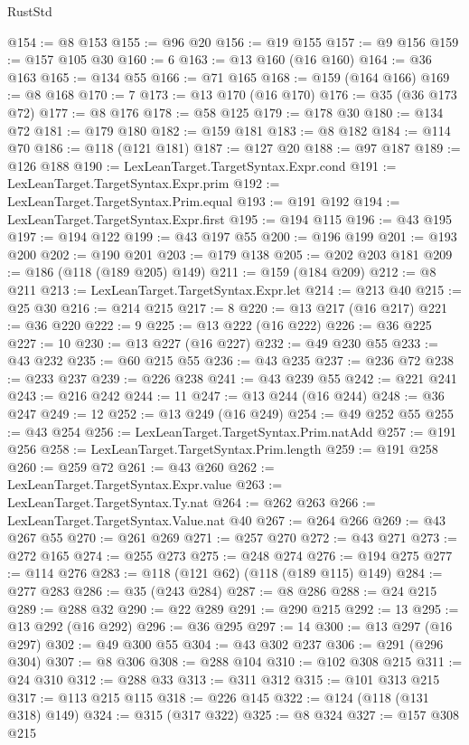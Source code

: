 \begin{lexlean}{RustStd}
\begin{coremodule}
{\begin{coremodule}
{{{{{{{{{{{{{{{{{{{{{{{{{{{{{{{@154 := @8 @153
@155 := @96 @20
@156 := @19 @155
@157 := @9 @156
@159 := @157 @105 @30
@160 := 6
@163 := @13 @160 (@16 @160)
@164 := @36 @163
@165 := @134 @55
@166 := @71 @165
@168 := @159 (@164 @166)
@169 := @8 @168
@170 := 7
@173 := @13 @170 (@16 @170)
@176 := @35 (@36 @173 @72)
@177 := @8 @176
@178 := @58 @125
@179 := @178 @30
@180 := @134 @72
@181 := @179 @180
@182 := @159 @181
@183 := @8 @182
@184 := @114 @70
@186 := @118 (@121 @181)
@187 := @127 @20
@188 := @97 @187
@189 := @126 @188
@190 := LexLeanTarget.TargetSyntax.Expr.cond
@191 := LexLeanTarget.TargetSyntax.Expr.prim
@192 := LexLeanTarget.TargetSyntax.Prim.equal
@193 := @191 @192
@194 := LexLeanTarget.TargetSyntax.Expr.first
@195 := @194 @115
@196 := @43 @195
@197 := @194 @122
@199 := @43 @197 @55
@200 := @196 @199
@201 := @193 @200
@202 := @190 @201
@203 := @179 @138
@205 := @202 @203 @181
@209 := @186 (@118 (@189 @205) @149)
@211 := @159 (@184 @209)
@212 := @8 @211
@213 := LexLeanTarget.TargetSyntax.Expr.let
@214 := @213 @40
@215 := @25 @30
@216 := @214 @215
@217 := 8
@220 := @13 @217 (@16 @217)
@221 := @36 @220
@222 := 9
@225 := @13 @222 (@16 @222)
@226 := @36 @225
@227 := 10
@230 := @13 @227 (@16 @227)
@232 := @49 @230 @55
@233 := @43 @232
@235 := @60 @215 @55
@236 := @43 @235
@237 := @236 @72
@238 := @233 @237
@239 := @226 @238
@241 := @43 @239 @55
@242 := @221 @241
@243 := @216 @242
@244 := 11
@247 := @13 @244 (@16 @244)
@248 := @36 @247
@249 := 12
@252 := @13 @249 (@16 @249)
@254 := @49 @252 @55
@255 := @43 @254
@256 := LexLeanTarget.TargetSyntax.Prim.natAdd
@257 := @191 @256
@258 := LexLeanTarget.TargetSyntax.Prim.length
@259 := @191 @258
@260 := @259 @72
@261 := @43 @260
@262 := LexLeanTarget.TargetSyntax.Expr.value
@263 := LexLeanTarget.TargetSyntax.Ty.nat
@264 := @262 @263
@266 := LexLeanTarget.TargetSyntax.Value.nat @40
@267 := @264 @266
@269 := @43 @267 @55
@270 := @261 @269
@271 := @257 @270
@272 := @43 @271
@273 := @272 @165
@274 := @255 @273
@275 := @248 @274
@276 := @194 @275
@277 := @114 @276
@283 := @118 (@121 @62) (@118 (@189 @115) @149)
@284 := @277 @283
@286 := @35 (@243 @284)
@287 := @8 @286
@288 := @24 @215
@289 := @288 @32
@290 := @22 @289
@291 := @290 @215
@292 := 13
@295 := @13 @292 (@16 @292)
@296 := @36 @295
@297 := 14
@300 := @13 @297 (@16 @297)
@302 := @49 @300 @55
@304 := @43 @302 @237
@306 := @291 (@296 @304)
@307 := @8 @306
@308 := @288 @104
@310 := @102 @308 @215
@311 := @24 @310
@312 := @288 @33
@313 := @311 @312
@315 := @101 @313 @215
@317 := @113 @215 @115
@318 := @226 @145
@322 := @124 (@118 (@131 @318) @149)
@324 := @315 (@317 @322)
@325 := @8 @324
@327 := @157 @308 @215
}}}}}}}}}}}}}}}}}}}}}}}}}}}}}}}
\end{coremodule}}
\end{coremodule}
\end{lexlean}
